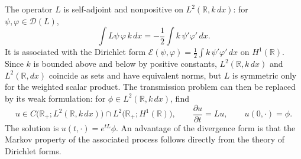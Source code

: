 The operator $L$ is self-adjoint and nonpositive on $L^2(\mathbb{R},k\,dx)$:
for $\psi,\varphi\in\mathcal{D}(L)$,
\[
	\int L\psi\,\varphi\,k\,dx = -\frac{1}{2}\int k\,\psi'\varphi'\,dx .
\]
It is associated with the Dirichlet form
$\mathcal{E}(\psi,\varphi) = \frac{1}{2}\int k\,\psi'\varphi'\,dx$ on
$H^1(\mathbb{R})$. Since $k$ is bounded above and below by positive constants,
$L^2(\mathbb{R},k\,dx)$ and $L^2(\mathbb{R},dx)$ coincide as sets and have
equivalent norms, but $L$ is symmetric only for the weighted scalar product.
The transmission problem can then be replaced by its weak formulation: for
$\phi\in L^2(\mathbb{R},k\,dx)$, find
\[
	u\in C\bigl(\mathbb{R}_+;L^2(\mathbb{R},k\,dx)\bigr)\cap L^2\bigl(\mathbb{R}_+;H^1(\mathbb{R})\bigr),
	\qquad \frac{\partial u}{\partial t} = Lu,\qquad u(0,\cdot) = \phi .
\]
The solution is $u(t,\cdot) = e^{tL}\phi$. An advantage of the divergence form
is that the Markov property of the associated process follows directly from
the theory of Dirichlet forms.
